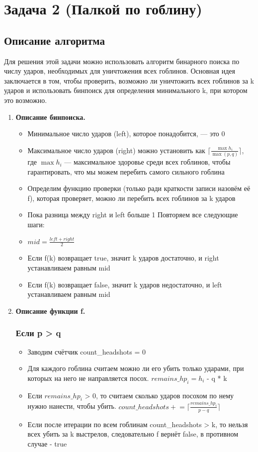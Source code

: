\documentclass[a4paper,14pt]{article}
\begin{document}
\section{Задача 2 (Палкой по гоблину)}
\subsection{Описание алгоритма}
Для решения этой задачи можно использовать алгоритм бинарного поиска по числу ударов, необходимых для уничтожения всех гоблинов. Основная идея заключается в том, чтобы проверить, возможно ли уничтожить всех гоблинов за k ударов и использовать бинпоиск для определения минимального k, при котором это возможно.


\begin{enumerate}
    \item\textbf{Описание бинпоиска.}
    \begin{itemize}
        \item Минимальное число ударов (left), которое понадобится, — это 0
        \item Максимальное число ударов (right) можно установить как $\lceil\frac{\max{h_i}}{\max{(p, q)}}\rceil$, где $\max{h_i}$ — максимальное здоровье среди всех гоблинов, чтобы гарантировать, что мы можем перебить самого сильного гоблина
        \item Определим функцию проверки (только ради краткости записи назовём её f), которая проверяет, можно ли перебить всех гоблинов за k ударов
        \item Пока разница между right и left больше 1 Повторяем все следующие шаги:
        \item $mid = \frac{left + right}{2}$
        \item Если f(k) возвращает true, значит k ударов достаточно, и right устанавливаем равным mid
        \item Если f(k) возвращает false, значит k ударов недостаточно, и left устанавливаем равным mid
    \end{itemize}

    \item\textbf{Описание функции f.}
    \subsubsection{ Если p > q }
    \begin{itemize}
        \item Заводим счётчик count\_headshots = 0
        \item Для каждого гоблина считаем можно ли его убить только ударами, при которых на него не направляется посох. $remains\_hp_i = h_i$ - q * k
        \item Если $remains\_hp_i$ > 0, то считаем сколько ударов посохом по нему нужно нанести, чтобы убить. $count\_headshots \mathrel{+}= \lceil\frac{remains\_hp_i}{p - q}\rceil$
        \item Если после итерации по всем гоблинам count\_headshots > k, то нельзя всех убить за k выстрелов, следовательно f вернёт false, в противном случае - true
    \end{itemize}


\end{enumerate}
\end{document}
